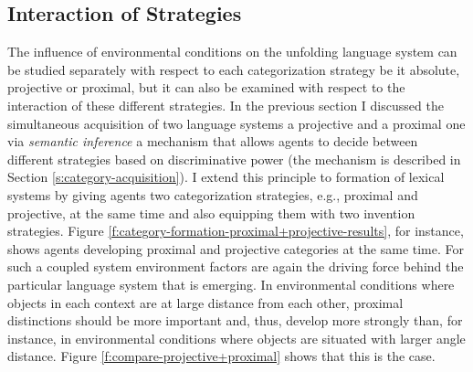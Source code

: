 \subsection{Interaction of Strategies}
The influence of environmental conditions on the unfolding language system 
can be studied separately with respect to each categorization strategy be
it absolute, projective or proximal, but it can also be examined with respect
to the interaction of these different strategies. In the previous section 
I discussed the simultaneous acquisition of two language systems a projective and
a proximal one via \emph{semantic inference} a mechanism
that allows agents to decide between different strategies based on discriminative power
(the mechanism is described in Section \ref{s:category-acquisition}). 
I extend this principle to formation of lexical systems by giving agents 
two categorization strategies, e.g., proximal and projective, at the same time 
and also equipping them with two invention strategies. 
Figure \ref{f:category-formation-proximal+projective-results}, for instance, 
shows agents developing proximal and projective categories at the same time. 
For such a coupled system environment factors are again the driving force behind 
the particular language system that is emerging. In environmental conditions where
objects in each context are at large distance from each other, proximal distinctions
should be more important and, thus, develop more strongly than, for instance, 
in environmental conditions where objects are situated with larger angle distance. 
Figure \ref{f:compare-projective+proximal} shows that this is the case.

